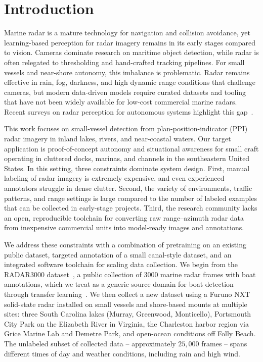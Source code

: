 \documentclass[conference]{IEEEtran}
\begin{document}
\section{Introduction}
Marine radar is a mature technology for navigation and collision avoidance, yet learning-based perception for radar imagery remains in its early stages compared to vision. Cameras dominate research on maritime object detection, while radar is often relegated to thresholding and hand-crafted tracking pipelines. For small vessels and near-shore autonomy, this imbalance is problematic. Radar remains effective in rain, fog, darkness, and high dynamic range conditions that challenge cameras, but modern data-driven models require curated datasets and tooling that have not been widely available for low-cost commercial marine radars. Recent surveys on radar perception for autonomous systems highlight this gap~\cite{zhou2022deep_radar_perception_sensors, srivastav2023radars_for_autonomous_driving_arxiv}.

This work focuses on small-vessel detection from plan-position-indicator (PPI) radar imagery in inland lakes, rivers, and near-coastal waters. Our target application is proof-of-concept autonomy and situational awareness for small craft operating in cluttered docks, marinas, and channels in the southeastern United States. In this setting, three constraints dominate system design. First, manual labeling of radar imagery is extremely expensive, and even experienced annotators struggle in dense clutter. Second, the variety of environments, traffic patterns, and range settings is large compared to the number of labeled examples that can be collected in early-stage projects. Third, the research community lacks an open, reproducible toolchain for converting raw range--azimuth radar data from inexpensive commercial units into model-ready images and annotations.

We address these constraints with a combination of pretraining on an existing public dataset, targeted annotation of a small canal-style dataset, and an integrated software toolchain for scaling data collection. We begin from the RADAR3000 dataset~\cite{kz258852_radar300_dataset_m_radar}, a public collection of $3000$ marine radar frames with boat annotations, which we treat as a generic source domain for boat detection through transfer learning~\cite{pan2010transfer_learning_survey}. We then collect a new dataset using a Furuno NXT solid-state radar installed on small vessels and shore-based mounts at multiple sites: three South Carolina lakes (Murray, Greenwood, Monticello), Portsmouth City Park on the Elizabeth River in Virginia, the Charleston harbor region via Grice Marine Lab and Demetre Park, and open-ocean conditions off Folly Beach. The unlabeled subset of collected data -- approximately $25,000$ frames -- spans different times of day and weather conditions, including rain and high wind.
\end{document}
